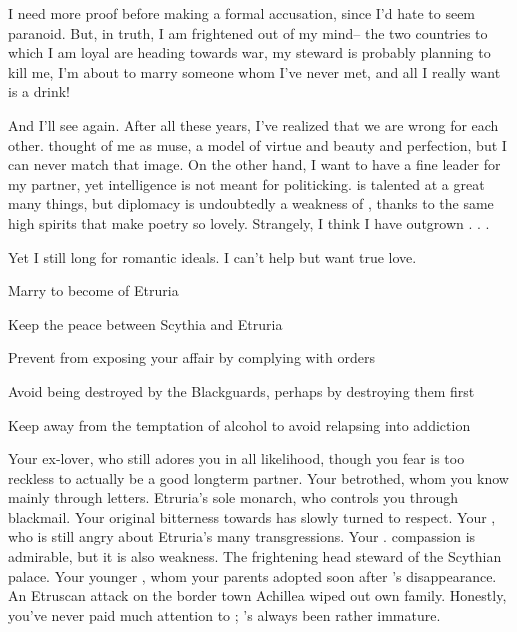 \documentclass[char]{Kos}
\begin{document}
I need more proof before making a formal accusation, since I'd hate to seem paranoid. But, in truth, I am frightened out of my mind-- the two countries to which I am loyal are heading towards war, my steward is probably planning to kill me, I'm about to marry someone whom I've never met, and all I really want is a drink!

And I'll see \cPoet{} again. After all these years, I've realized that we are wrong for each other. \cPoet{\They} thought of me as \cPoet{\their} muse, a model of virtue and beauty and perfection, but I can never match that image. On the other hand, I want to have a fine leader for my partner, yet \cPoet{\their} intelligence is not meant for politicking. \cPoet{\They} is talented at a great many things, but diplomacy is undoubtedly a weakness of \cPoet{\theirs}, thanks to the same high spirits that make \cPoet{\their} poetry so lovely. Strangely, I think I have outgrown \cPoet{\them} . . .

Yet I still long for \cPoet{\their} romantic ideals. I can't help but want true love.

\begin{itemz}[Goals]
 \item Marry \cGroom{} to become \cBride{\prince} of Etruria
 \item Keep the peace between Scythia and Etruria
 \item Prevent \cEtruriaKing{} from exposing your affair by complying with \cEtruriaKing{\their} orders
 \item Avoid being destroyed by the Blackguards, perhaps by destroying them first
 \item Keep away from the temptation of alcohol to avoid relapsing into addiction
\end{itemz}

\begin{contacts}
\contact{\cPoet{}} Your ex-lover, who still adores you in all likelihood, though you fear \cPoet{\they} is too reckless to actually be a good longterm partner.
\contact{\cGroom{}} Your betrothed, whom you know mainly through letters.
\contact{\cEtruriaKing{}} Etruria's sole monarch, who controls you through blackmail. Your original bitterness towards \cEtruriaKing{\them} has slowly turned to respect.
\contact{\cScythiaQueen{}} Your \cScythiaQueen{\parent}, who is still angry about Etruria's many transgressions. 
\contact{\cScythiaKing{}} Your \cScythiaKing{\parent}. \cScythiaKing{\Their} compassion is admirable, but it is also \cScythiaKing{\their} weakness.
\contact{\cButler{}} The frightening head steward of the Scythian palace.
\contact{\cWard{}} Your younger \cWard{\sibling}, whom your parents adopted soon after \cFugitive{}'s disappearance. An Etruscan attack on the border town Achillea wiped out \cWard{\their} own family. Honestly, you've never paid much attention to \cWard{\them}; \cWard{\they}'s always been rather immature.
\end{contacts}
\end{document}
